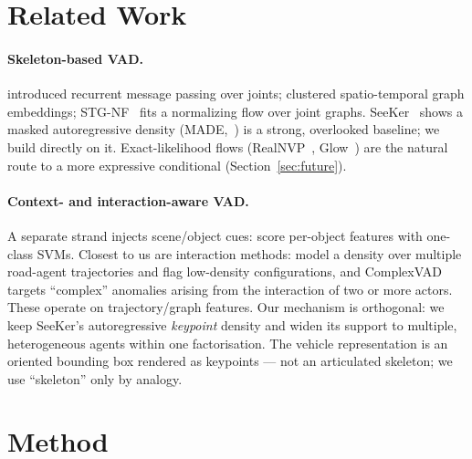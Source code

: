\documentclass{article}
\begin{document}
\section{Related Work}
\label{sec:related}

\paragraph{Skeleton-based VAD.} \citet{morais2019messagepassing} introduced
recurrent message passing over joints; \citet{markovitz2020graph} clustered
spatio-temporal graph embeddings; STG-NF~\citep{hirschorn2023normalizing} fits a
normalizing flow over joint graphs. SeeKer~\citep{delic2025seeker} shows a
masked autoregressive density (MADE,~\citealp{germain2015made}) is a strong,
overlooked baseline; we build directly on it. Exact-likelihood flows
(RealNVP~\citealp{dinh2017realnvp}, Glow~\citealp{kingma2018glow}) are the
natural route to a more expressive conditional (Section~\ref{sec:future}).

\paragraph{Context- and interaction-aware VAD.} A separate strand injects
scene/object cues: \citet{ionescu2019object} score per-object features with
one-class SVMs. Closest to us are interaction methods:
\citet{wiederer2022anomaly} model a density over multiple road-agent trajectories
and flag low-density configurations, and ComplexVAD~\citep{complexvad2025}
targets ``complex'' anomalies arising from the interaction of two or more
actors. These operate on trajectory/graph features. Our mechanism is orthogonal:
we keep SeeKer's autoregressive \emph{keypoint} density and widen its support to
multiple, heterogeneous agents within one factorisation. The vehicle
representation is an oriented bounding box rendered as keypoints --- not an
articulated skeleton; we use ``skeleton'' only by analogy.

\section{Method}
\label{sec:method}
\end{document}
